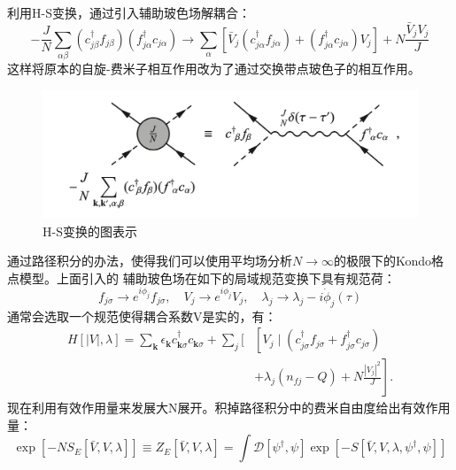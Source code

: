 \documentclass[10pt,openany]{book}
\theoremstyle{thmstyle} %
\theoremstyle{defstyle} %
\theoremstyle{prostyle} %
\begin{document}
利用H-S变换，通过引入辅助玻色场解耦合：
\begin{equation}
	-\frac{J}{N} \sum_{\alpha \beta}\left(c_{j \beta}^{\dagger} f_{j \beta}\right)\left(f_{j \alpha}^{\dagger} c_{j \alpha}\right) \rightarrow \sum_\alpha\left[\bar{V}_j\left(c_{j \alpha}^{\dagger} f_{j \alpha}\right)+\left(f_{j \alpha}^{\dagger} c_{j \alpha}\right) V_j\right]+N \frac{\bar{V}_j V_j}{J}
\end{equation}
这样将原本的自旋-费米子相互作用改为了通过交换带点玻色子的相互作用。
\begin{figure}[htbp]
	\centering
	\includegraphics*[scale=0.7]{H-ST.png}
	\caption{H-S变换的图表示}
\end{figure}
通过路径积分的办法，使得我们可以使用平均场分析$ N\to\infty $的极限下的Kondo格点模型。上面引入的
辅助玻色场在如下的局域规范变换下具有规范荷：
\begin{equation}
	f_{j \sigma} \rightarrow e^{i \phi_j} f_{j \sigma}, \quad V_j \rightarrow e^{i \phi_j} V_j, \quad \lambda_j \rightarrow \lambda_j-i \dot{\phi}_j(\tau)
\end{equation} 
通常会选取一个规范使得耦合系数V是实的，有：
\begin{equation}
	\begin{aligned}
		H[|V|, \lambda]=\sum_{\mathbf{k}} \epsilon_{\mathbf{k}} c_{\mathbf{k} \sigma}^{\dagger} c_{\mathbf{k} \sigma}+\sum_j[ & {\left[V_j \mid\left(c_{j \sigma}^{\dagger} f_{j \sigma}+f_{j \sigma}^{\dagger} c_{j \sigma}\right)\right.} \\
		& \left.+\lambda_j\left(n_{f j}-Q\right)+N \frac{\left|V_j\right|^2}{J}\right] .
		\end{aligned}
\end{equation}
现在利用有效作用量来发展大N展开。积掉路径积分中的费米自由度给出有效作用量：
\begin{equation}
	\exp \left[-N S_E[\bar{V}, V, \lambda]\right] \equiv Z_E[\bar{V}, V, \lambda]=\int \mathcal{D}\left[\psi^{\dagger}, \psi\right] \exp \left[-S\left[\bar{V}, V, \lambda, \psi^{\dagger}, \psi\right]\right]
\end{equation}
\end{document}
